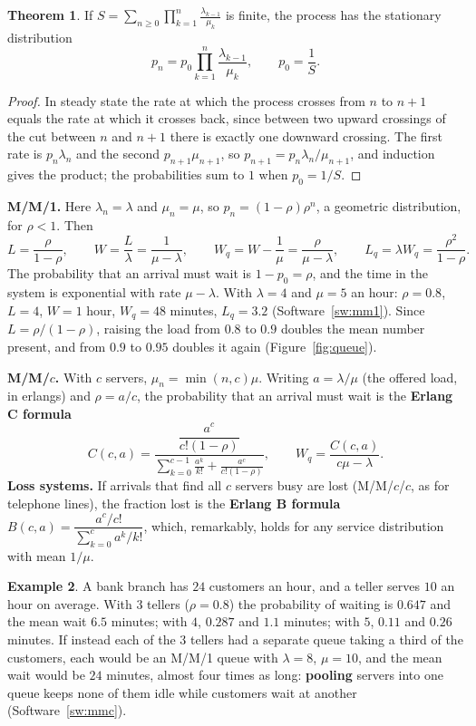 \documentclass[11pt,a4paper]{article}
\numberwithin{equation}{section}
\theoremstyle{definition}
\newtheorem{thm}{Theorem}[subsection]
\newtheorem{exa}[thm]{Example}
\begin{document}
\begin{thm}
\label{thm:birthdeath}
If $S = \sum_{n \geq 0}\prod_{k = 1}^n\frac{\lambda_{k - 1}}{\mu_k}$ is finite, the process has the stationary distribution
\[
p_n = p_0\prod_{k = 1}^n\frac{\lambda_{k - 1}}{\mu_k}, \qquad p_0 = \frac1S .
\]
\end{thm}

\begin{proof}
In steady state the rate at which the process crosses from $n$ to $n + 1$ equals the rate at which it crosses back, since between two upward crossings of the cut between $n$ and $n + 1$ there is exactly one downward crossing. The first rate is $p_n\lambda_n$ and the second $p_{n + 1}\mu_{n + 1}$, so
$p_{n + 1} = p_n\lambda_n/\mu_{n + 1}$, and induction gives the product; the probabilities sum to $1$ when $p_0 = 1/S$.
\end{proof}

\textbf{M/M/1.} Here $\lambda_n = \lambda$ and $\mu_n = \mu$, so $p_n = (1 - \rho)\rho^n$, a geometric distribution, for $\rho < 1$. Then
\[
L = \frac\rho{1 - \rho}, \qquad W = \frac L\lambda = \frac1{\mu - \lambda}, \qquad W_q = W - \frac1\mu = \frac\rho{\mu - \lambda}, \qquad L_q = \lambda W_q = \frac{\rho^2}{1 - \rho} .
\]
The probability that an arrival must wait is $1 - p_0 = \rho$, and the time in the system is exponential with rate $\mu - \lambda$. With $\lambda = 4$ and $\mu = 5$ an hour: $\rho = 0.8$, $L = 4$, $W = 1$ hour, $W_q = 48$ minutes, $L_q = 3.2$ (Software~\ref{sw:mm1}). Since $L = \rho/(1 - \rho)$, raising the load from $0.8$ to
$0.9$ doubles the mean number present, and from $0.9$ to $0.95$ doubles it again (Figure~\ref{fig:queue}).

\textbf{M/M/$c$.} With $c$ servers, $\mu_n = \min(n, c)\mu$. Writing $a = \lambda/\mu$ (the offered load, in erlangs) and $\rho = a/c$, the probability that an arrival must wait is the \textbf{Erlang C formula}
\[
C(c, a) = \frac{\dfrac{a^c}{c!(1 - \rho)}}{\displaystyle\sum_{k = 0}^{c - 1}\frac{a^k}{k!} + \frac{a^c}{c!(1 - \rho)}}, \qquad W_q = \frac{C(c, a)}{c\mu - \lambda} .
\]
\textbf{Loss systems.} If arrivals that find all $c$ servers busy are lost (M/M/$c$/$c$, as for telephone lines), the fraction lost is the \textbf{Erlang B formula} $B(c, a) = \dfrac{a^c/c!}{\sum_{k = 0}^ca^k/k!}$, which, remarkably, holds for any service distribution with mean $1/\mu$.

\begin{exa}
\label{ex:bank}
A bank branch has $24$ customers an hour, and a teller serves $10$ an hour on average. With $3$ tellers ($\rho = 0.8$) the probability of waiting is $0.647$ and the mean wait $6.5$ minutes; with $4$, $0.287$ and $1.1$ minutes; with $5$, $0.11$ and $0.26$ minutes. If instead each of the $3$ tellers had a separate queue taking a third of
the customers, each would be an M/M/1 queue with $\lambda = 8$, $\mu = 10$, and the mean wait would be $24$ minutes, almost four times as long: \textbf{pooling} servers into one queue keeps none of them idle while customers wait at another (Software~\ref{sw:mmc}).
\end{exa}
\end{document}
